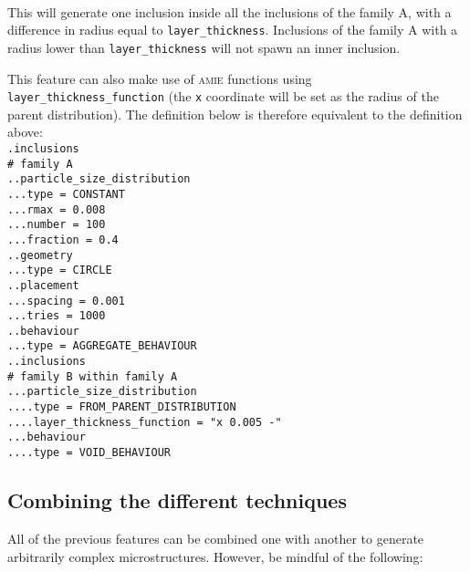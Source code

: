 \documentclass[10pt]{article}
\begin{document}
\paragraph{}This will generate one inclusion inside all the inclusions of the family A, with a difference in radius equal to \verb+layer_thickness+. Inclusions of the family A with a radius lower than \verb+layer_thickness+ will not spawn an inner inclusion.

This feature can also make use of \textsc{amie} functions using \verb+layer_thickness_function+ (the \verb+x+ coordinate will be set as the radius of the parent distribution). The definition below is therefore equivalent to the definition above:\\

\noindent \verb+.inclusions+\\
\verb+# family A+\\
\verb+..particle_size_distribution+\\
\verb+...type = CONSTANT+\\
\verb+...rmax = 0.008+\\
\verb+...number = 100+\\
\verb+...fraction = 0.4+\\
\verb+..geometry+\\
\verb+...type = CIRCLE+\\
\verb+..placement+\\
\verb+...spacing = 0.001+\\
\verb+...tries = 1000+\\
\verb+..behaviour+\\
\verb+...type = AGGREGATE_BEHAVIOUR+\\
\verb+..inclusions+\\
\verb+# family B within family A+\\
\verb+...particle_size_distribution+\\
\verb+....type = FROM_PARENT_DISTRIBUTION+\\
\verb+....layer_thickness_function = "x 0.005 -"+\\
\verb+...behaviour+\\
\verb+....type = VOID_BEHAVIOUR+

\subsection{Combining the different techniques}

All of the previous features can be combined one with another to generate arbitrarily complex microstructures. However, be mindful of the following:
\end{document}
